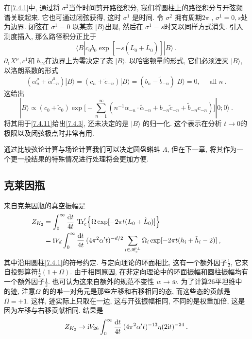 在\eqref{7.4.1}中, 通过将 $\sigma^{2}$当作时间剪开路径积分, 我们将圆柱上的路径积分与开弦频谱关联起来. 它也可通过闭弦获得, 这时 $\sigma^{1}$ 是时间. 
令 $\sigma^{2}$ 拥有周期$2 \pi$ , $\sigma^{1}=0, s$处为边界. 闭弦在 $\sigma^{1}=0$ 以某态 $|B\rangle$出现, 
然后在 $\sigma^{1}=s $时又以同样方式消失. 引入测度插入, 那么路径积分正比于
\begin{equation}
 	\langle B|c_{0} b_{0} \exp [-s(L_{0}+\tilde{L}_{0})]| B\rangle \:. \label{7.4.11}
\end{equation}
$\partial_{1} X^{\mu}, c^{1}$和 $b_{12}$在边界上为零决定了态 $|B\rangle$. 以哈密顿量的形式, 它们必须湮灭 $|B\rangle$, 以洛朗系数的形式
\begin{equation}
	(\alpha_{n}^{\mu}+\tilde{\alpha}_{-n}^{\mu})|B\rangle=(c_{n}+\tilde{c}_{-n})|B\rangle=(b_{n}-\tilde{b}_{-n})|B\rangle=0, \quad \text { all } n\:. \label{7.4.12}
\end{equation}
这给出
\begin{equation}
	|B\rangle \propto (c_{0}+\tilde{c}_{0}) \exp \biggl[-\sum_{n=1}^{\infty}(n^{-1} \alpha_{-n} \cdot \tilde{\alpha}_{-n}+b_{-n} \tilde{c}_{-n}+\tilde{b}_{-n} c_{-n})\biggr]|0 ; 0\rangle \:. \label{7.4.13}
\end{equation}
将其用于\eqref{7.4.11}给出\eqref{7.4.3}, 还未决定的是 $|B\rangle$ 的归一化. 这个表示在分析 $t \rightarrow 0$的极限以及闭弦极点时非常有用.

通过比较弦论计算与场论计算我们可以决定圆盘蝌蚪 $\Lambda$, 但在下一章, 将其作为一个更一般结果的特殊情况进行处理将会更加方便.

\subsection*{克莱因瓶}

来自克莱因瓶的真空振幅是
\begin{align}
	Z_{K_{2}} &=\int_{0}^{\infty} \frac{\mathrm{d} t}{4 t}\: \operatorname{Tr}_{\mathrm{c}}^{\prime} 
	\Bigl\{\Omega \exp [-2 \pi t (L_{0}+\tilde{L}_{0})]\Bigr\}  \nonumber \\
	&=\mathrm{i} V_{d} \int_{0}^{\infty} \frac{\mathrm{d} t}{4 t} \:(4 \pi^{2} \alpha^{\prime} t)^{-d / 2} 
	\sum_{i \in \mathscr{H}_{c}^{\perp}} \Omega_{i} \exp [-2 \pi t(h_{i}+\tilde{h}_{i}-2)] \:, \label{7.4.14}
\end{align}
其中沿用圆柱\eqref{7.4.1}的符号约定. 与定向理论的环面相比, 这有一个额外因子$\frac{1}{2}$, 它来自投影算符$\frac{1}{2}(1+\Omega)$. 
由于相同原因, 在非定向理论中的环面振幅和圆柱振幅均有一个额外因子$\frac{1}{2}$. 也可认为这来自额外的规范不变性 $w \rightarrow \bar{w}$. 
为了计算26平坦维中的迹, 注意$\Omega$ 的的唯一对角元是那些左移和右移相同的态, 而这些态的贡献是 $\Omega=+1 $. 
这样, 迹实际上只取在一边, 这与开弦振幅相同, 不同的是权重加倍, 这是因为左移与右移贡献相同. 结果是
\begin{equation}
	Z_{K_{2}} \rightarrow \mathrm{i} V_{26} \int_{0}^{\infty} \frac{\mathrm{d} t}{4 t}\: (4 \pi^{2} \alpha^{\prime} t)^{-13} \eta(2 \mathrm{i} t)^{-24} \:. 
	\label{7.4.15}
\end{equation}

